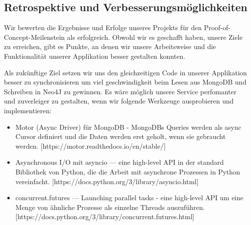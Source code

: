 \documentclass{article}
\begin{document}
\subsection{Retrospektive und Verbesserungsmöglichkeiten}
Wir bewerten die Ergebnisse und Erfolge unseres Projekts für den Proof-of-Concept-Meilenstein als erfolgreich. Obwohl wir es geschafft haben, unsere Ziele zu erreichen, gibt es Punkte, an denen wir unsere Arbeitsweise und die Funktionalität unserer Applikation besser gestalten konnten.

Als zukünftige Ziel setzen wir uns den gleichzeitigen Code in unserer Applikation besser zu synchronisieren um viel geschwindigkeit beim Lesen aus MongoDB und Schreiben in Neo4J zu gewinnen. Es wäre möglich unsere Service perfomanter und zuverleiger zu gestalten, wenn wir folgende Werkzeuge ausprobieren und implementieren:
\begin{itemize}
    \item Motor (Async Driver) für MongoDB - MongoDBs Queries werden als async Cursor definiert und die Daten werden erst geholt, wenn sie gebraucht werden. [https://motor.readthedocs.io/en/stable/]
    \item Asynchronous I/O mit asyncio — eine high-level API in der standard Bibliothek von Python, die die Arbeit mit asynchrone Prozessen in Python vereinfacht. [https://docs.python.org/3/library/asyncio.html]
    \item concurrent.futures — Launching parallel tasks - eine high-level API um eine Menge von ähnliche Prozesse als einzelne Threads auszuführen. [https://docs.python.org/3/library/concurrent.futures.html]
\end{itemize}
\end{document}
